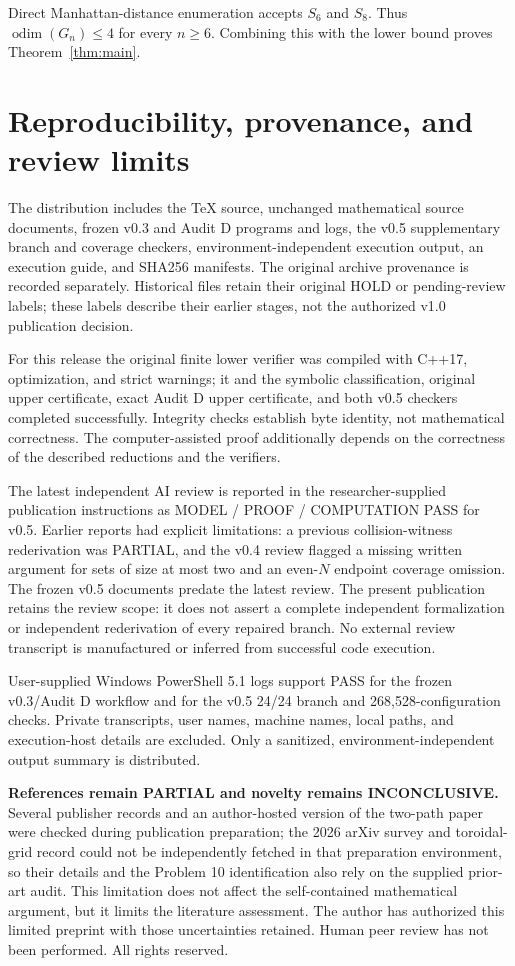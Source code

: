 \documentclass[11pt,a4paper]{article}
\newcommand{\odim}{\operatorname{odim}}
\begin{document}
Direct Manhattan-distance enumeration accepts $S_6$ and $S_8$. Thus $\odim(G_n)\le4$ for every $n\ge6$. Combining this with the lower bound proves Theorem~\ref{thm:main}.

\section{Reproducibility, provenance, and review limits}
The distribution includes the TeX source, unchanged mathematical source documents, frozen v0.3 and Audit D programs and logs, the v0.5 supplementary branch and coverage checkers, environment-independent execution output, an execution guide, and SHA256 manifests. The original archive provenance is recorded separately. Historical files retain their original HOLD or pending-review labels; these labels describe their earlier stages, not the authorized v1.0 publication decision.

For this release the original finite lower verifier was compiled with C++17, optimization, and strict warnings; it and the symbolic classification, original upper certificate, exact Audit D upper certificate, and both v0.5 checkers completed successfully. Integrity checks establish byte identity, not mathematical correctness. The computer-assisted proof additionally depends on the correctness of the described reductions and the verifiers.

The latest independent AI review is reported in the researcher-supplied publication instructions as MODEL / PROOF / COMPUTATION PASS for v0.5. Earlier reports had explicit limitations: a previous collision-witness rederivation was PARTIAL, and the v0.4 review flagged a missing written argument for sets of size at most two and an even-$N$ endpoint coverage omission. The frozen v0.5 documents predate the latest review. The present publication retains the review scope: it does not assert a complete independent formalization or independent rederivation of every repaired branch. No external review transcript is manufactured or inferred from successful code execution.

User-supplied Windows PowerShell 5.1 logs support PASS for the frozen v0.3/Audit D workflow and for the v0.5 24/24 branch and 268,528-configuration checks. Private transcripts, user names, machine names, local paths, and execution-host details are excluded. Only a sanitized, environment-independent output summary is distributed.

\textbf{References remain PARTIAL and novelty remains INCONCLUSIVE.} Several publisher records and an author-hosted version of the two-path paper were checked during publication preparation; the 2026 arXiv survey and toroidal-grid record could not be independently fetched in that preparation environment, so their details and the Problem 10 identification also rely on the supplied prior-art audit. This limitation does not affect the self-contained mathematical argument, but it limits the literature assessment. The author has authorized this limited preprint with those uncertainties retained. Human peer review has not been performed. All rights reserved.
\end{document}

